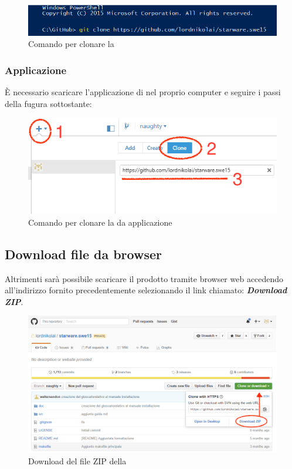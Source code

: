 \documentclass[12pt,a4paper]{article}
\begin{document}
		\begin{figure}[H]	
			\centering
			\includegraphics[width=1.0\linewidth]{../img/manualeInstallazione/gitShell.png}
			\caption{Comando per clonare la }
			\label{Comando per clonare la repository}
		\end{figure}
	\subsubsection{Applicazione}
	È necessario scaricare l'applicazione di  nel proprio computer e seguire i passi della fugura sottostante:
	
	\begin{figure}[H]	
		\centering
		\includegraphics[width=1.0\linewidth]{../img/manualeInstallazione/gitHubTool.png}
		\caption{Comando per clonare la  da applicazione}
		\label{Comando per clonare la repository da applicazione}
	\end{figure}
	
	\subsection{Download file da browser}
	Altrimenti sarà possibile scaricare il prodotto tramite browser web accedendo
	all’indirizzo fornito precedentemente selezionando il link chiamato: \textbf{\textit{Download ZIP}}.
	
		\begin{figure}[H]	
			\centering
			\includegraphics[width=1.0\linewidth]{../img/manualeInstallazione/downloadRepo.png}
			\caption{Download del file ZIP della }
			\label{Download dell file ZIP della repository}
		\end{figure}
	
\end{document}
